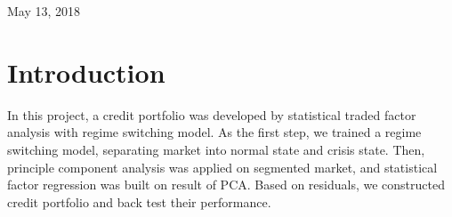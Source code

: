 \documentclass[12pt]{article}
\begin{document}
\begin{titlepage}


{\large May 13, 2018}\\[1.5cm] %


 

\vfill %

\end{titlepage}

\newpage
\pagestyle{fancyplain}
\cfoot{}

\newpage
\pagestyle{fancyplain}
\cfoot{}

\newpage
\tableofcontents
\pagestyle{fancyplain}
\cfoot{}

\newpage
\pagestyle{fancyplain}
\cfoot{}

\section{Introduction}
In this project, a credit portfolio was developed by statistical traded factor analysis with regime switching model. As the first step, we trained a regime switching model, separating market into normal state and crisis state. Then, principle component analysis was applied on segmented market, and statistical factor regression was built on result of PCA. Based on residuals, we constructed credit portfolio and back test their performance.
\end{document}
